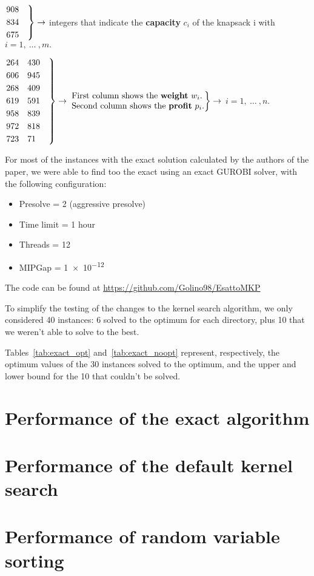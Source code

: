 	\begin{flushleft}
		$\begin{rcases*}
			908 \quad
			\\834 
			\\675 
		\end{rcases*} \rightarrow $ integers that indicate the \textbf{capacity}  $ c_{i} $  of the knapsack i with \space $ i=1,\:\dots\:,m. $
	\end{flushleft}
	\begin{flushleft}
		$\begin{rcases*}
			264	\quad 430 \quad
			\\606 \quad	945
			\\268 \quad	409
			\\619 \quad	591
			\\958 \quad	839
			\\972 \quad	818
			\\723 \quad	71
		\end{rcases*} \rightarrow $ 
		$\begin{rcases*}
			{\begin{tabular}{@{}l@{}}
				First column shows the \textbf{weight} $ w_{i}. $ \\
				Second column shows the \textbf{profit} $ p_{i} $.
			\end{tabular}} 
		\end{rcases*} \rightarrow \space$ $ i=1,\:\dots\:,n. $
	\end{flushleft}

For most of the instances with the exact solution calculated by the authors of the paper, we were able to
find too the exact using an exact GUROBI solver, with the following configuration:

\begin{itemize}
    \item Presolve = 2 (aggressive presolve)
    \item Time limit = 1 hour
    \item Threads = 12
    \item MIPGap = \num{1e-12}
\end{itemize}

The code can be found at \url{https://github.com/Golino98/EsattoMKP}

To simplify the testing of the changes to the kernel search algorithm,
we only considered 40 instances: 6 solved to the optimum for each directory,
plus 10 that we weren't able to solve to the best.

Tables~\ref{tab:exact_opt} and~\ref{tab:exact_noopt} represent,
respectively, the optimum values of the 30 instances solved to
the optimum, and the upper and lower bound for the 10
that couldn't be solved.




\section{Performance of the exact algorithm}


\section{Performance of the default kernel search}


\section{Performance of random variable sorting}
